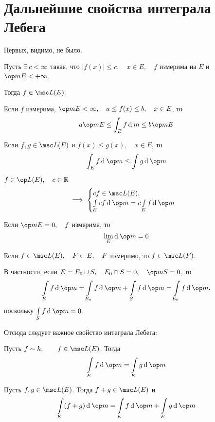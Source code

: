 \section{Дальнейшие свойства интеграла Лебега}

Первых, видимо, не было.

\begin{props}
	\item Пусть $ \exists\, c < \infty $ такая, что $ |f(x)| \le c, \quad x \in E, \quad f $ измерима на $ E $ и $ \op m E < +\infty $.

	Тогда $ f \in \msc L(E) $.

	\item Если $ f $ измерима, $ \op m E < \infty, \quad a \le f(x) \le b, \quad x \in E $, то
	$$ a \op m E \le \int_E f \di m \le b \op m E $$

	\item Если $ f, g \in \msc L(E) $ и $ f(x) \le g(x), \quad x \in E $, то
	$$ \int_E f \di \op m \le \int g \di \op m $$

	\item $ f \in \op L(E), \quad c \in \R $
	$$ \implies
	\begin{cases}
		cf \in \msc L(E), \\
		\int\limits_E cf \di \op m = c \int\limits_E f \di \op m
	\end{cases} $$

	\item Если $ \op m E = 0, \quad f $ измерима, то
	$$ \lim\limits_E \di \op m = 0 $$

	\item Если $ f \in \msc L(E), \quad F \sub E, \quad F $ измеримо, то $ f \in \msc L(F) $.

	В частности, если $ E = E_0 \cup S, \quad E_0 \cap S = 0, \quad \op m S = 0 $, то
	$$ \int\limits_E f \di \op m = \int\limits_{E_0} f \di \op m + \int\limits_S f \di \op m = \int\limits_{E_0} f \di \op m, $$
	поскольку $ \int\limits_S f \di \op m = 0 $.

	Отсюда следует важное свойство интеграла Лебега:

	\item Пусть $ f \sim h, \qquad f \in \msc L(E) $. Тогда
	$$ \int\limits_E f \di \op m = \int\limits_E g \di \op m $$

	\item Пусть $ f, g \in \msc L(E) $. Тогда $ f + g \in \msc L(E) $ и
	$$ \int\limits_E (f + g) \di \op m = \int\limits_E f \di \op m + \int\limits_E g \di \op m $$
\end{props}

